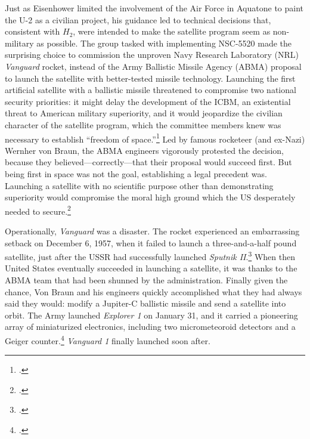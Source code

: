 \documentclass[12pt]{extarticle}
\begin{document}
Just as Eisenhower limited the involvement of the Air Force in Aquatone to paint the U-2 as a civilian project, his guidance led to technical decisions that, consistent with $H_2$, were intended to make the satellite program seem as non-military as possible. The group tasked with implementing NSC-5520 made the surprising choice to commission the unproven Navy Research Laboratory (NRL) \emph{Vanguard} rocket, instead of the Army Ballistic Missile Agency (ABMA) proposal to launch the satellite with better-tested missile technology. Launching the first artificial satellite with a ballistic missile threatened to compromise two national security priorities: it might delay the development of the ICBM, an existential threat to American military superiority, and it would jeopardize the civilian character of the satellite program, which the committee members knew was necessary to establish ``freedom of space.''\footcite[122]{mcdougall_heavens_1985} Led by famous rocketeer (and ex-Nazi) Wernher von Braun, the ABMA engineers vigorously protested the decision, because they believed---correctly---that their proposal would succeed first. But being first in space was not the goal, establishing a legal precedent was. Launching a satellite with no scientific purpose other than demonstrating superiority would compromise the moral high ground which the US desperately needed to secure.\footcite[129-131. Though the NRL is run by the Navy, it functioned like a civilian scientific operation. All parties involved believed that the NRL proposal would be seen as a civilian project---especially when compared with the Army agency building nuclear delivery systems.]{day_eye_2015}

Operationally, \emph{Vanguard} was a disaster. The rocket experienced an embarrassing setback on December 6, 1957, when it failed to launch a three-and-a-half pound satellite, just after the USSR had successfully launched \emph{Sputnik II}.\footcite[119. This time, the satellite carried a dog named Laika. The Soviets put a dog in space before the Americans even managed to get a satellite up there.]{killian_sputnik_1977} When then United States eventually succeeded in launching a satellite, it was thanks to the ABMA team that had been shunned by the administration. Finally given the chance, Von Braun and his engineers quickly accomplished what they had always said they would: modify a Jupiter-C ballistic missile and send a satellite into orbit. The Army launched \emph{Explorer 1} on January 31, and it carried a pioneering array of miniaturized electronics, including two micrometeoroid detectors and a Geiger counter.\footcite[168]{mcdougall_heavens_1985} \emph{Vanguard 1} finally launched soon after.
\end{document}
